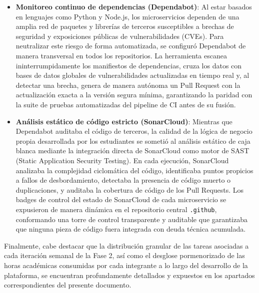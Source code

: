 \begin{itemize}
    \item \textbf{Monitoreo continuo de dependencias (Dependabot)}: Al estar basados en lenguajes como Python y Node.js, los microservicios dependen de una amplia red de paquetes y librerías de terceros susceptibles a brechas de seguridad y exposiciones públicas de vulnerabilidades (CVEs). Para neutralizar este riesgo de forma automatizada, se configuró Dependabot de manera transversal en todos los repositorios. La herramienta escanea ininterrumpidamente los manifiestos de dependencias, cruza los datos con bases de datos globales de vulnerabilidades actualizadas en tiempo real y, al detectar una brecha, genera de manera autónoma un Pull Request con la actualización exacta a la versión segura mínima, garantizando la paridad con la suite de pruebas automatizadas del pipeline de CI antes de su fusión.
    \item \textbf{Análisis estático de código estricto (SonarCloud)}: Mientras que Dependabot auditaba el código de terceros, la calidad de la lógica de negocio propia desarrollada por los estudiantes se sometió al análisis estático de caja blanca mediante la integración directa de SonarCloud como motor de SAST (Static Application Security Testing). En cada ejecución, SonarCloud analizaba la complejidad ciclomática del código, identificaba puntos propicios a fallos de desbordamiento, detectaba la presencia de código muerto o duplicaciones, y auditaba la cobertura de código de los Pull Requests. Los badges de control del estado de SonarCloud de cada microservicio se expusieron de manera dinámica en el repositorio central \texttt{.github}, conformando una torre de control transparente y auditable que garantizaba que ninguna pieza de código fuera integrada con deuda técnica acumulada.
\end{itemize}

Finalmente, cabe destacar que la distribución granular de las tareas asociadas a cada iteración semanal de la Fase 2, así como el desglose pormenorizado de las horas académicas consumidas por cada integrante a lo largo del desarrollo de la plataforma, se encuentran profundamente detallados y expuestos en los apartados correspondientes del presente documento.
